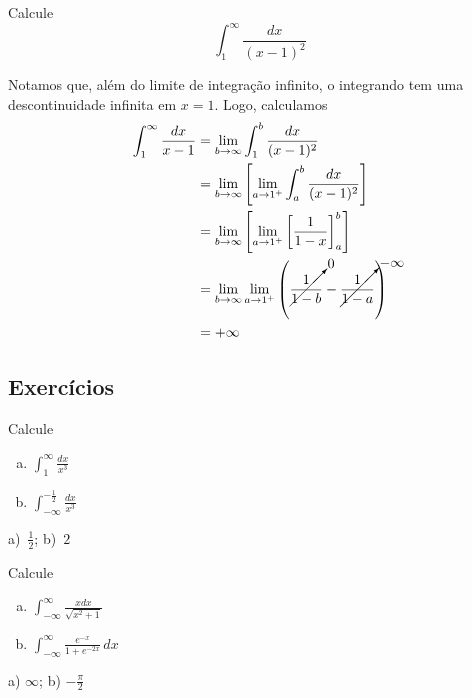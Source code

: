 \begin{exeresol}
  Calcule
  \begin{equation}
    \int_1^\infty\frac{dx}{(x-1)^2}
  \end{equation}
\end{exeresol}
\begin{resol}
  Notamos que, além do limite de integração infinito, o integrando tem uma descontinuidade infinita em $x=1$. Logo, calculamos
  \begin{align}
    \int_1^\infty\frac{dx}{x-1} &= \lim_{b\to\infty}\int_1^b\frac{dx}{(x-1)^2}\\
                                &= \lim_{b\to\infty}\left[\lim_{a\to 1^+}\int_a^b\frac{dx}{(x-1)^2}\right]\\
                                &= \lim_{b\to\infty}\left[\lim_{a\to 1^+}\left[\frac{1}{1-x}\right]_a^b\right]\\
                                &= \lim_{b\to\infty}\lim_{a\to 1^+}\left(\cancelto{0}{\frac{1}{1-b}} - \cancelto{-\infty}{\frac{1}{1-a}}\right)\\
                                &= +\infty
  \end{align}
\end{resol}

\subsection*{Exercícios}

\begin{exer}
  Calcule
  \begin{enumerate}[a)]
  \item $\displaystyle\int_1^\infty\frac{dx}{x^3}$
  \item $\displaystyle\int_{-\infty}^{-\frac{1}{2}}\frac{dx}{x^3}$
  \end{enumerate}
\end{exer}
\begin{resp}
  a)~$\frac{1}{2}$; b)~$2$
\end{resp}

\begin{exer}
  Calcule
  \begin{enumerate}[a)]
  \item $\displaystyle\int_{-\infty}^\infty\frac{xdx}{\sqrt{x^2+1}}$
  \item $\displaystyle\int_{-\infty}^{\infty}\frac{e^{-x}}{1+e^{-2x}}\,dx$
  \end{enumerate}  
\end{exer}
\begin{resp}
  a) $\infty$; b) $-\frac{\pi}{2}$
\end{resp}


